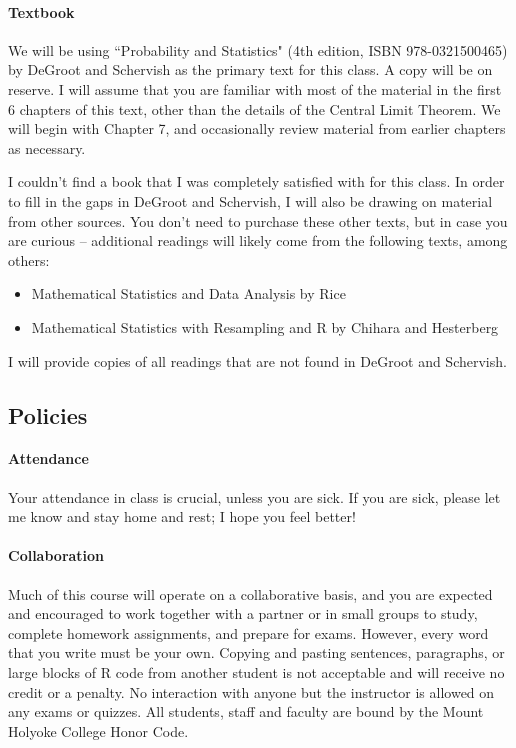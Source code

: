 \documentclass[11pt]{article}
\begin{document}
\paragraph{Textbook}

We will be using ``Probability and Statistics" (4th edition, ISBN 978-0321500465) by DeGroot and Schervish as the primary text for this class.  A copy will be on reserve.  I will assume that you are familiar with most of the material in the first 6 chapters of this text, other than the details of the Central Limit Theorem.  We will begin with Chapter 7, and occasionally review material from earlier chapters as necessary.

I couldn't find a book that I was completely satisfied with for this class.  In order to fill in the gaps in DeGroot and Schervish, I will also be drawing on material from other sources.  You don't need to purchase these other texts, but in case you are curious -- additional readings will likely come from the following texts, among others:
\begin{itemize}
\item Mathematical Statistics and Data Analysis by Rice
\item Mathematical Statistics with Resampling and R by Chihara and Hesterberg
\end{itemize}
I will provide copies of all readings that are not found in DeGroot and Schervish.

\subsection*{Policies}

\paragraph{Attendance}

Your attendance in class is crucial, unless you are sick.  If you are sick, please let me know and stay home and rest; I hope you feel better!

\paragraph{Collaboration}

Much of this course will operate on a collaborative basis, and you are expected and encouraged to work together with a partner or in small groups to study, complete homework assignments, and prepare for exams. However, every word that you write must be your own.  Copying and pasting sentences, paragraphs, or large blocks of R code from another student is not acceptable and will receive no credit or a penalty.  No interaction with anyone but the instructor is allowed on any exams or quizzes.  All students, staff and faculty are bound by the Mount Holyoke College Honor Code.
\end{document}
